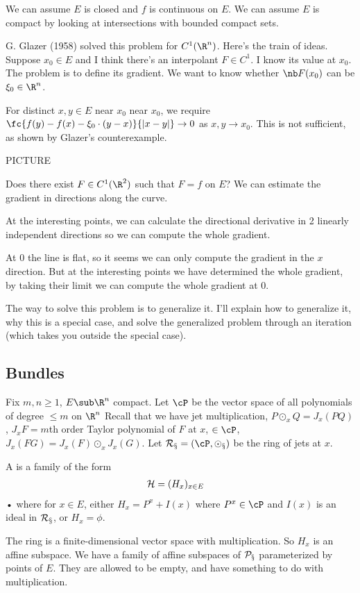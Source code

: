 We can assume $E$ is closed and $f$ is continuous on $E$. %
We can assume $E$ is compact by looking at intersections with bounded compact sets.

G. Glazer (1958) solved this problem for $C^1(\R^n)$. Here's the train of ideas. Suppose $x_0\in E$ and I think there's an interpolant $F\in C^1$. I know its value at $x_0$. The problem is to define its gradient. We want to know whether $\nb F(x_0)$ can be $\xi_0\in \R^n$.

For distinct $x,y\in E$ near $x_0$ near $x_0$, we require $\fc{f(y)-f(x)-\xi_0\cdot (y-x)}{|x-y|}\to 0$ as $x,y\to x_0$. This is not sufficient, as shown by Glazer's counterexample. %

PICTURE

Does there exist $F\in C^1(\R^2)$ such that $F=f$ on $E$? We can estimate the gradient in directions along the curve. 

At the interesting points, we can calculate the directional derivative in 2 linearly independent directions so we can compute the whole gradient.

At 0 the line is flat, so it seems we can only compute the gradient in the $x$ direction. But at the interesting points we have determined the whole gradient, by taking their limit we can compute the whole gradient at 0.

The way to solve this problem is to generalize it. I'll explain how to generalize it, why this is a special case, and solve the generalized problem through an iteration (which takes you outside the special case). 

\subsection{Bundles}

Fix $m,n\ge 1$, $E\sub \R^n$ compact. Let $\cP$ be the vector space of all polynomials of degree $\le m$ on $\R^n$ %
Recall that we have jet multiplication, $P\odot_x Q = J_x(PQ)$, $J_xF =m$th order Taylor polynomial of $F$ at $x$, $\in \cP$, $J_x(FG) = J_x(F)\odot_x J_x(G)$.  Let $\cal R_x=(\cP,\odot_x)$ be the ring of jets at $x$.

\begin{df}
A  is a family of the form 
\begin{align}
\cal H &= (H_x)_{x\in E}
\end{align}•
where for $x\in E$, either $H_x=P^x + I(x)$ where $P^x\in \cP$ and $I(x)$ is an ideal in $\cal R_x$, or $H_x=\phi$.
\end{df}
The ring is a finite-dimensional vector space with multiplication. So $H_x$ is an affine subspace. We have a family of affine subspaces of $\cal P_x$ parameterized by points of $E$. They are allowed to be empty, and have something to do with multiplication.

